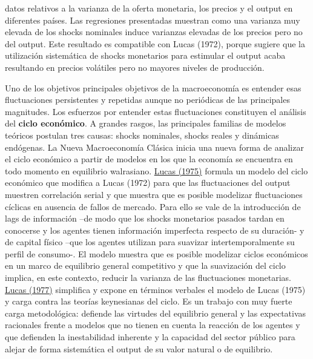 \documentclass{nuevotema}
\begin{document}
datos relativos a la varianza de la oferta monetaria, los precios y el output en diferentes países. Las regresiones presentadas muestran como una varianza muy elevada de los shocks nominales induce varianzas elevadas de los precios pero no del output. Este resultado es compatible con Lucas (1972), porque sugiere que la utilización sistemática de shocks monetarios para estimular el output acaba resultando en precios volátiles pero no mayores niveles de producción.

Uno de los objetivos principales objetivos de la macroeconomía es entender esas fluctuaciones persistentes y repetidas aunque no periódicas de las principales magnitudes. Los esfuerzos por entender estas fluctuaciones constituyen el análisis del \textbf{ciclo económico}. A grandes rasgos, las principales familias de modelos teóricos postulan tres causas: shocks nominales, shocks reales y dinámicas endógenas. La Nueva Macroeconomía Clásica inicia una nueva forma de analizar el ciclo económico a partir de modelos en los que la economía se encuentra en todo momento en equilibrio walrasiano. \underline{Lucas (1975)} formula un modelo del ciclo económico que modifica a Lucas (1972) para que las fluctuaciones del output muestren correlación serial y que muestra que es posible modelizar fluctuaciones cíclicas en ausencia de fallos de mercado. Para ello se vale de la introducción de lags de información --de modo que los shocks monetarios pasados tardan en conocerse y los agentes tienen información imperfecta respecto de su duración- y de capital físico --que los agentes utilizan para suavizar intertemporalmente su perfil de consumo-. El modelo muestra que es posible modelizar ciclos económicos en un marco de equilibrio general competitivo y que la suavización del ciclo implica, en este contexto, reducir la varianza de las fluctuaciones monetarias. \underline{Lucas (1977)} simplifica y expone en términos verbales el modelo de Lucas (1975) y carga contra las teorías keynesianas del ciclo. Es un trabajo con muy fuerte carga metodológica: defiende las virtudes del equilibrio general y las expectativas racionales frente a modelos que no tienen en cuenta la reacción de los agentes y que defienden la inestabilidad inherente y la capacidad del sector público para alejar de forma sistemática el output de su valor natural o de equilibrio. 
\end{document}
